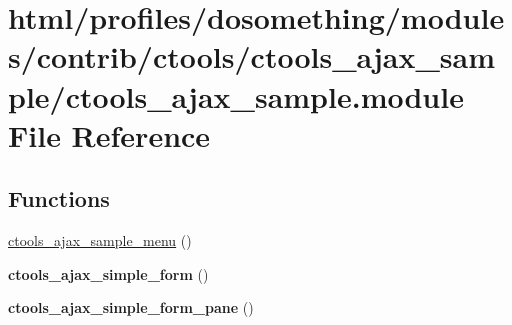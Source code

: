 \hypertarget{ctools__ajax__sample_8module}{
\section{html/profiles/dosomething/modules/contrib/ctools/ctools\_\-ajax\_\-sample/ctools\_\-ajax\_\-sample.module File Reference}
\label{ctools__ajax__sample_8module}
}
\subsection*{Functions}
\begin{DoxyCompactItemize}
\item 
\hyperlink{ctools__ajax__sample_8module_a16236e81b3e1c72f9b97e5532fbdd630}{ctools\_\-ajax\_\-sample\_\-menu} ()
\item 
\hypertarget{ctools__ajax__sample_8module_aae1d36888b26a18941cbf955fd7a0691}{
{\bfseries ctools\_\-ajax\_\-simple\_\-form} ()}
\label{ctools__ajax__sample_8module_aae1d36888b26a18941cbf955fd7a0691}

\item 
\hypertarget{ctools__ajax__sample_8module_a76ce581a4f6bd3ae42342f982de72335}{
{\bfseries ctools\_\-ajax\_\-simple\_\-form\_\-pane} ()}
\label{ctools__ajax__sample_8module_a76ce581a4f6bd3ae42342f982de72335}


\end{DoxyCompactItemize}
